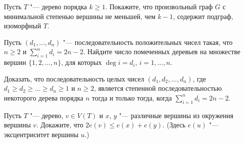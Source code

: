 \documentclass[12pt, a4paper]{article}
\begin{document}
\begin{problemList}
\bigskip

{Пусть $T$ "--- дерево порядка $k\ge 1$. Покажите, что произвольный граф $G$ с минимальной степенью вершины не меньшей, чем $k-1$, содержит подграф, изоморфный $T$.}

\medskip

{Пусть $(d_1, \ldots, d_n)$ "--- последовательность положительных чисел такая,
что $n\ge 2$ и $\sum\limits_{i=1}^n d_i=2n-2$.
Найдите число помеченных деревьев на множестве вершин $\{1, 2, \ldots, n\}$, для которых $\deg i=d_i$, $i=1, \ldots, n$.}

\bigskip

{Доказать, что последовательность целых чисел $(d_1, d_2, \ldots, d_n)$,
где $d_1 \ge d_2 \ge \ldots \ge d_n \ge 1$ и $n \ge 2$,
является степенной последовательностью некоторого дерева порядка $n$ тогда и только тогда,
когда $\sum\limits_{i = 1}^n d_i = 2n - 2$.}

\medskip

{Пусть $T$ "--- дерево, $v \in V(T)$ и $x$, $y$ "--- различные вершины из окружения вершины $v$.
Докажите, что $2e(v) \le e(x) + e(y)$. (Здесь $e(u)$ "--- эксцентриситет вершины $u$.)}

\end{problemList}
\end{document}
